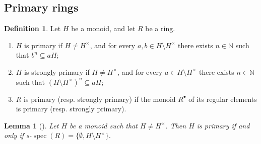 \documentclass[a4paper, 10pt]{amsart}
\newcommand{\defit}[1]{{\textsf{#1}}}
\theoremstyle{plain}
\newtheorem{lemma}[theorem]{Lemma}
\theoremstyle{definition}
\newtheorem{definition}[theorem]{Definition}
\theoremstyle{remark}
\newcommand{\N}{\mathbb N}
\DeclareMathOperator{\spec}{spec}
\numberwithin{equation}{section}
\begin{document}
\subsection{Primary rings}
\begin{definition}Let $H$ be a monoid, and let $R$ be a ring. 
    \begin{enumerate}
        \item $H$ is  \defit{primary} if $H\ne H^\times$, and for every $a,b\in H\setminus H^\times$ there exists $n\in \N$ such that $b^n\subseteq aH;$
        \item $H$ is \defit{strongly primary} if $H\ne H^\times$, and for every $a\in H\setminus H^\times$ there exists $n\in \N$ such that $(H\setminus H^\times)^n\subseteq aH;$
        \item $R$ is  \defit{primary} (resp. \defit{strongly primary}) if the monoid $R^\bullet$  of its regular elements is primary (resp. strongly primary).
    \end{enumerate}
\end{definition}
\begin{lemma}[{\cite[Lemma 2.7.7]{GHK06}}]\label{lemma:primary}
    Let $H$ be a monoid such that $H\ne H^\times$. Then $H$ is primary if and only if s-$\spec(R)=\{\emptyset, H\setminus H^\times\}.$
\end{lemma}
\end{document}
